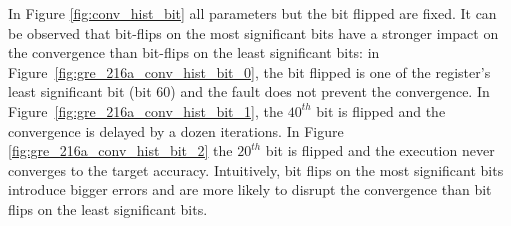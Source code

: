 \documentclass[twoside]{article}
\newcounter{fig}\setcounter{fig}{0}
\begin{document}
  In Figure \ref{fig:conv_hist_bit} all parameters but the bit flipped are fixed. It can be observed that bit-flips on the most significant bits have a stronger impact on the convergence than bit-flips on the least significant bits: in Figure~\ref{fig:gre_216a_conv_hist_bit_0}, the bit flipped is one of the register's least significant bit (bit 60) and the fault does not prevent the convergence. In Figure~\ref{fig:gre_216a_conv_hist_bit_1}, the $40^{th}$ bit is flipped and the convergence is delayed by a dozen iterations. In Figure \ref{fig:gre_216a_conv_hist_bit_2} the $20^{th}$ bit is flipped and the execution never converges to the target accuracy.
  Intuitively, bit flips on the most significant bits introduce bigger errors and are more likely to disrupt the convergence than bit flips on the least significant bits.
\end{document}
